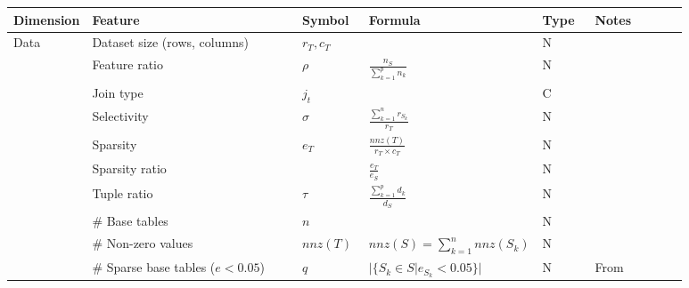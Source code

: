 \begin{tabular}{lp{0.35\linewidth}p{0.10\linewidth}>{\footnotesize}p{0.2\linewidth}p{0.08\linewidth}p{0.15\linewidth}}
    \toprule
    Dimension                              & Feature                                 & Symbol                            & Formula                                 & Type & Notes                                \\
    \midrule\midrule
    \multirow[t]{10}{*}{Data}              & Dataset size (rows, columns)            & $r_T, c_T$                        &                                         & N    &                                      \\
                                           & Feature ratio                           & $\rho$                            & $\frac{n_S}{\sum_{k=1}^p n_k} $         & N    &                                      \\
                                           & Join type                               & $j_t$                             &                                         & C    &                                      \\
                                           & Selectivity                             & $\sigma$                          & $\frac{\sum_{k=1}^{n}r_{S_k}}{r_T}$     & N    &                                      \\
                                           & Sparsity                                & $e_T$                             & $\frac{nnz(T)}{r_T\times c_T}$          & N    &                                      \\
                                           & Sparsity ratio                          &                                   & $\frac{e_T}{e_S}$                       & N    &                                      \\
                                           & Tuple ratio                             & $\tau$                            & $\frac{\sum_{k=1}^p d_k}{d_S}$          & N    &                                      \\
                                           & \# Base tables                          & $n$                               &                                         & N    &                                      \\
                                           & \# Non-zero values                      & $nnz(T)$                          & $nnz(S) = \sum_{k=1}^{n}nnz(S_k)$       & N    &                                      \\
                                           & \# Sparse base tables ($e < 0.05$)      & $q$                               & $|\{S_k \in S| e_{S_k} < 0.05\}|$       & N    & From \cite{MorpheusFI}               \\


\end{tabular}
